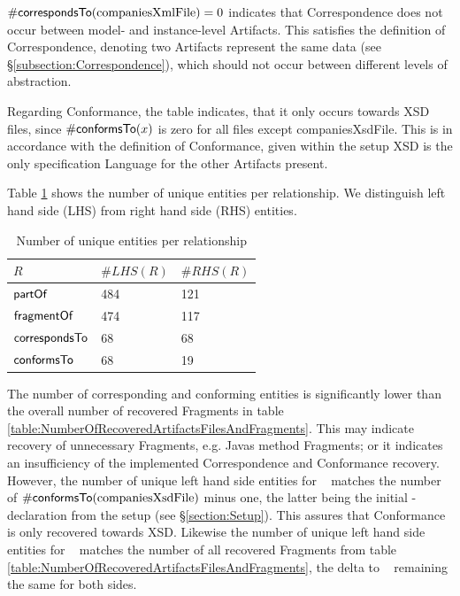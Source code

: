 $\#\textsf{correspondsTo}(\text{companiesXmlFile}) = 0$ indicates that \gls{Correspondence} does not occur between model- and instance-level \glspl{Artifact}.
This satisfies the definition of \gls{Correspondence}, denoting two \glspl{Artifact} represent the same data (see §\ref{subsection:Correspondence}), which should not occur between different levels of abstraction.

Regarding \gls{Conformance}, the table indicates, that it only occurs towards \gls{XSD} files, since $\#\textsf{conformsTo}(x)$ is zero for all files except companiesXsdFile.
This is in accordance with the definition of \gls{Conformance}, given within the setup \gls{XSD} is the only specification \gls{Language} for the other \glspl{Artifact} present.

Table \ref{table:NumberOfUniqueEntitiesPerRelationship} shows the number of unique entities per relationship.
We distinguish left hand side (LHS) from right hand side (RHS) entities.
\begin{table}[h!]
\begin{center}
\begin{tabular}{|l|l|l|}
\hline
$R$ & $\#LHS(R)$ & $\#RHS(R)$
\\ \hline
$\textsf{partOf}$ & 484 & 121
\\ \hline
$\textsf{fragmentOf}$ & 474 & 117
\\ \hline
$\textsf{correspondsTo}$ & 68 & 68
\\ \hline
$\textsf{conformsTo}$ & 68 & 19
\\ \hline 
\end{tabular}
\end{center}
\caption{Number of unique entities per relationship}
\label{table:NumberOfUniqueEntitiesPerRelationship}
\end{table}
The number of corresponding and conforming entities is significantly lower than the overall number of recovered \glspl{Fragment} in table \ref{table:NumberOfRecoveredArtifactsFilesAndFragments}.
This may indicate recovery of unnecessary \glspl{Fragment}, e.g. \glspl{Java} method \glspl{Fragment}; or it indicates an insufficiency of the implemented \gls{Correspondence} and \gls{Conformance} recovery.
However, the number of unique left hand side entities for \conformsTo~ matches the number of $\#\textsf{conformsTo}(\text{companiesXsdFile})$ minus one, the latter being the initial \conformsTo-declaration from the setup (see §\ref{section:Setup}).
This assures that \gls{Conformance} is only recovered towards \gls{XSD}.
Likewise the number of unique left hand side entities for \fragmentOf~ matches the number of all recovered \glspl{Fragment} from table \ref{table:NumberOfRecoveredArtifactsFilesAndFragments}, the delta to \partOf~ remaining the same for both sides.